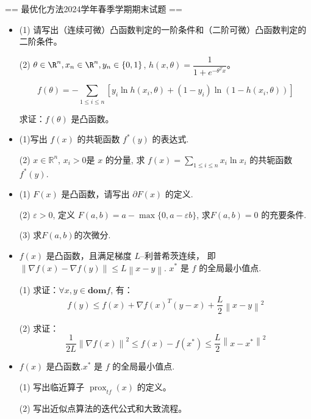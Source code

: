 
== 最优化方法2024学年春季学期期末试题 ==

\begin{itemize}
\item[一、] (1) 请写出（连续可微）凸函数判定的一阶条件和（二阶可微）凸函数判定的二阶条件。

(2) $\theta \in \R^{n},x_{n} \in \R^{n}, y_{n} \in \{0,1\}$, 
$h(x,\theta)= \dfrac{1}{1+e^{-\theta^{T}x}}$。

\[
f( \theta ) = - \sum_{1 \leq i \leq n} \left[ y_{i}\ln h(x_{i},\theta) +(1-y_{i})\ln (1- h(x_{i}, \theta))\right] 
\]

求证：$f(\theta )$ 是凸函数。

\item[二、] (1)写出 $f(x)$ 的共轭函数 $f^{*}(y)$ 的表达式.

(2) $x \in \mathbb{R}^{n}$, $x_{i} > 0$是 $x $ 的分量, 
求 $f(x) = \sum\limits_{1 \leq i \leq n} x_{i} \ln x_{i}  $ 的共轭函数 $f^{*} (y)$.

\item[三、] (1) $F(x)$ 是凸函数，请写出 $\partial F(x)$ 的定义.

(2) $\varepsilon >0 $, 定义 $F(a,b)= a - \max\{0,a-\varepsilon b\}$,
求$F(a,b)=0$ 的充要条件.

(3) 求$F(a,b)$的次微分.

\item[四、] $f(x)$ 是凸函数，且满足梯度 $L$--利普希茨连续，
即 $\left\| \nabla f(x)- \nabla f(y) \right\| \leq L \left\| x-y \right\| $. 
$x^*$ 是 $f$ 的全局最小值点.

(1) 求证：$\forall x,y \in \mathbf{dom} f$, 有：
\[
f(y) \leq f(x) + \nabla f(x)^{T}(y-x) + \frac{L}{2}\left\| x-y \right\|^{2}
\]

(2) 求证：
\[
\frac{1}{2L}\left\| \nabla f(x) \right\|^{2} 
\leq f(x) - f(x^*) \leq \frac{L}{2}\left\| x-x^* \right\|^{2}
\]

\item[五、] $f(x)$ 是凸函数.$x^*$ 是 $f$ 的全局最小值点.

(1) 写出临近算子 $\operatorname{prox}_{tf}(x)$ 的定义。

(2) 写出近似点算法的迭代公式和大致流程。


\end{itemize}
